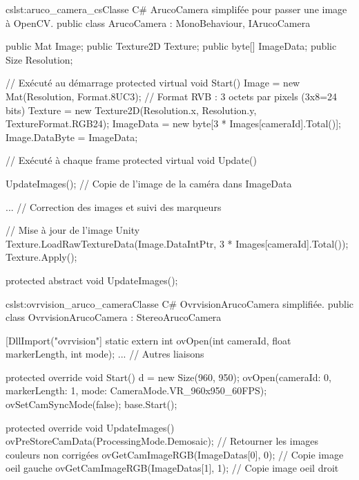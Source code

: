 \begin{listingETS}{cs}{lst:aruco_camera_cs}{Classe C\# ArucoCamera simplifée pour passer une image à OpenCV.}
  public class ArucoCamera : MonoBehaviour, IArucoCamera
  {
    public Mat Image;
    public Texture2D Texture;
    public byte[] ImageData;
    public Size Resolution;

    // Exécuté au démarrage
    protected virtual void Start()
    {
      Image = new Mat(Resolution, Format.8UC3); // Format RVB : 3 octets par pixels (3x8=24 bits)
      Texture = new Texture2D(Resolution.x, Resolution.y, TextureFormat.RGB24);
      ImageData = new byte[3 * Images[cameraId].Total()];
      Image.DataByte = ImageData;
    }

    // Exécuté à chaque frame
    protected virtual void Update()
    {
      UpdateImages(); // Copie de l'image de la caméra dans ImageData

      ... // Correction des images et suivi des marqueurs

      // Mise à jour de l'image Unity
      Texture.LoadRawTextureData(Image.DataIntPtr, 3 * Images[cameraId].Total());
      Texture.Apply();
    }

    protected abstract void UpdateImages();
  }
\end{listingETS}

\begin{listingETS}{cs}{lst:ovrvision_aruco_camera}{Classe C\# OvrvisionArucoCamera simplifiée.}
  public class OvrvisionArucoCamera : StereoArucoCamera
  {
    [DllImport("ovrvision"]
    static extern int ovOpen(int cameraId, float markerLength, int mode);
    ... // Autres liaisons

    protected override void Start()
    {
      d = new Size(960, 950);
      ovOpen(cameraId: 0, markerLength: 1, mode: CameraMode.VR_960x950_60FPS);
      ovSetCamSyncMode(false);
      base.Start();
    }

    protected override void UpdateImages()
    {
      ovPreStoreCamData(ProcessingMode.Demosaic); // Retourner les images couleurs non corrigées
      ovGetCamImageRGB(ImageDatas[0], 0); // Copie image oeil gauche
      ovGetCamImageRGB(ImageDatas[1], 1); // Copie image oeil droit
    }
  }
\end{listingETS}

